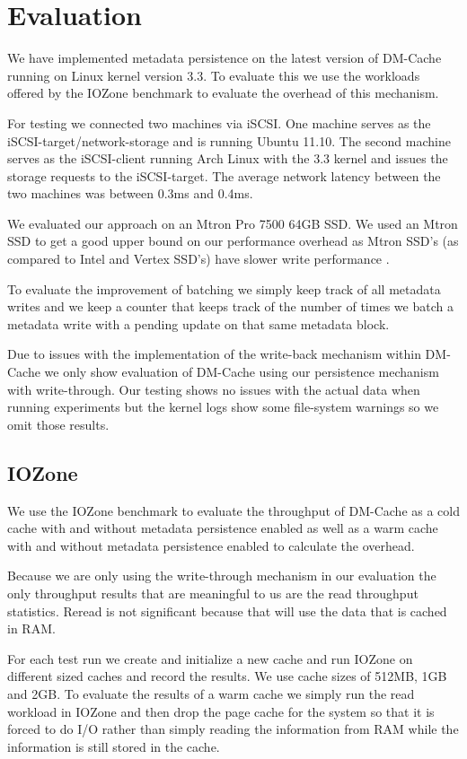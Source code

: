\section{Evaluation}
\label{sec:evaluation}

We have implemented metadata persistence on the latest version of
DM-Cache running on Linux kernel version 3.3. To evaluate this we use
the workloads offered by the IOZone benchmark to evaluate the overhead
of this mechanism.

For testing we connected two machines via iSCSI. One machine serves as
the iSCSI-target/network-storage and is running Ubuntu 11.10. The
second machine serves as the iSCSI-client running Arch Linux with the
3.3 kernel and issues the storage requests to the iSCSI-target. The
average network latency between the two machines was between 0.3ms and
0.4ms.

We evaluated our approach on an Mtron Pro 7500 64GB SSD. We used an
Mtron SSD to get a good upper bound on our performance overhead as
Mtron SSD's (as compared to Intel and Vertex SSD's) have slower write
performance \cite{FIOS}.

To evaluate the improvement of batching we simply keep track of all
metadata writes and we keep a counter that keeps track of the number
of times we batch a metadata write with a pending update on that same
metadata block.

Due to issues with the implementation of the write-back mechanism
within DM-Cache we only show evaluation of DM-Cache using our
persistence mechanism with write-through. Our testing shows no issues
with the actual data when running experiments but the kernel logs show
some file-system warnings so we omit those results.

\subsection{IOZone}

We use the IOZone benchmark to evaluate the throughput of DM-Cache as
a cold cache with and without metadata persistence enabled as well as
a warm cache with and without metadata persistence enabled to
calculate the overhead.

Because we are only using the write-through mechanism in our
evaluation the only throughput results that are meaningful to us are
the read throughput statistics. Reread is not significant because that
will use the data that is cached in RAM.

For each test run we create and initialize a new cache and run IOZone
on different sized caches and record the results. We use cache sizes
of 512MB, 1GB and 2GB. To evaluate the results of a warm cache we
simply run the read workload in IOZone and then drop the page cache
for the system so that it is forced to do I/O rather than simply
reading the information from RAM while the information is still stored
in the cache.


